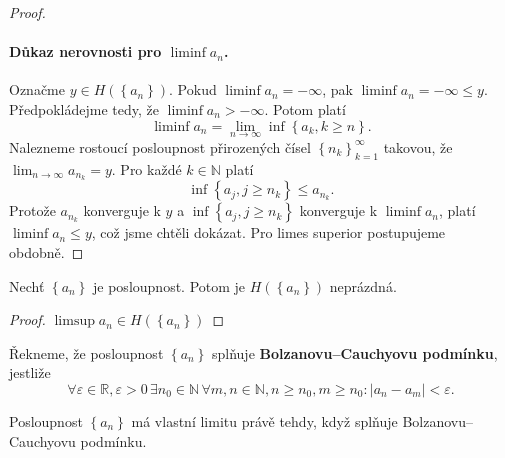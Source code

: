 \begin{proof}
	\paragraph{Důkaz nerovnosti pro $\liminf a_n$.}
	Označme $y\in H \left( \left \{ a_n \right \}  \right ) $. Pokud $\liminf a_n = -\infty$,
	pak $\liminf a_n = -\infty \leq y$. Předpokládejme tedy, že $\liminf a_n > -\infty$. Potom
	platí
	$$
	    \liminf a_n = \lim_{n\to \infty} \inf \left \{ a_k, k\geq n \right \}.
	$$
	Nalezneme rostoucí posloupnost přirozených čísel $\left \{ n_k \right \}_{k=1}^\infty $ takovou,
	že $\lim_{n\to \infty} a_{n_k}=y$. Pro každé $k \in \mathbb N $ platí
	$$
	    \inf \left \{ a_j, j\geq n_k \right \} \leq a_{n_k}.
	$$
	Protože $a_{n_k}$ konverguje k $y$ a $\inf \left \{ a_j, j\geq n_k \right \}$ konverguje
	k $\liminf a_n$, platí $\liminf a_n \leq y$, což jsme chtěli dokázat.
	Pro limes superior postupujeme obdobně.
\end{proof}

\begin{dusledek}
	Nechť $\left \{ a_n \right \} $ je posloupnost. Potom je $H \left( \left \{ a_n \right \}  \right ) $
	neprázdná.
\end{dusledek}

\begin{proof}
	$\limsup a_n \in H \left( \left \{ a_n \right \}  \right ) $
\end{proof}

\begin{definice}
	Řekneme, že posloupnost $\left \{ a_n \right \} $ splňuje \textbf{Bolzanovu--Cauchyovu podmínku},
	jestliže
	$$
	    \forall \varepsilon \in \mathbb R, \varepsilon > 0 \, \exists n_0 \in \mathbb N\, \forall m,n \in \mathbb N , n\geq n_0, m\geq n_0: |a_n-a_m| < \varepsilon.
	$$
\end{definice}

\begin{veta} \label{veta2.18}
	Posloupnost $\left \{ a_n \right \} $ má vlastní limitu právě tehdy, když splňuje Bolzanovu--\-Cau\-chy\-o\-vu podmínku.
\end{veta}


